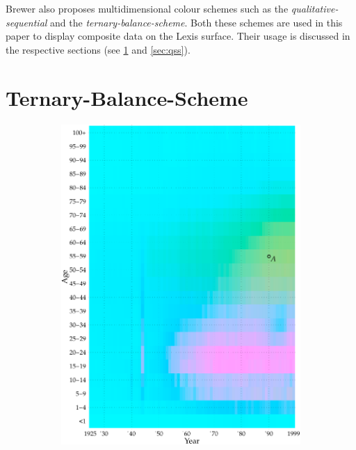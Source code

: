 \documentclass[a4paper, 12pt]{scrartcl}
\begin{document}
Brewer also proposes multidimensional colour schemes such as the \emph{qualitative-sequential} and the \emph{ternary-balance-scheme}. Both these schemes are used in this paper to display composite data on the Lexis surface. Their usage is discussed in the respective sections (see \ref{sec:tbs} and \ref{sec:qss}).

\clearpage

\section{Ternary-Balance-Scheme} %
\label{sec:tbs}

\begin{figure}[!htb]
\begin{subfigure}[t]{0.65\textwidth}
  \includegraphics[width = \textwidth]{../fig/plot-tern_balance_no_lgnd.pdf}

\end{subfigure}
\end{figure}
\end{document}
